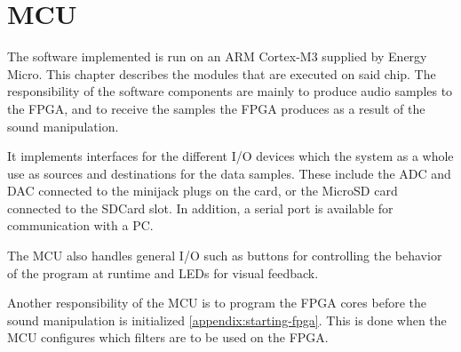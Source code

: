 \clearpage
\section{MCU} \label{section:mcu}

The software implemented is run on an ARM Cortex-M3 supplied by Energy Micro.
This chapter describes the modules that are executed on said chip. The
responsibility of the software components are mainly to produce audio samples to
the FPGA, and to receive the samples the FPGA produces as a result of the sound
manipulation.

It implements interfaces for the different I/O devices which the system as a
whole use as sources and destinations for the data samples. These include the
ADC and DAC connected to the minijack plugs on the card, or the MicroSD card
connected to the SDCard slot. In addition, a serial port is available for
communication with a PC.

The MCU also handles general I/O such as buttons for controlling the behavior
of the program at runtime and LEDs for visual feedback.

Another responsibility  of the MCU is to program the FPGA cores before the sound
manipulation is initialized \ref{appendix:starting-fpga}. This is done when the
MCU configures which filters are to be used on the FPGA. 




